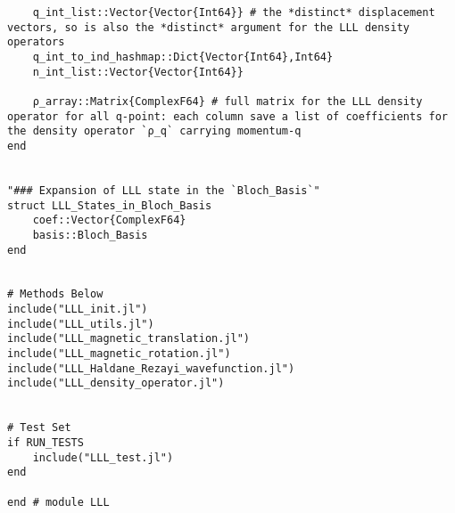 \begin{verbatim}
    q_int_list::Vector{Vector{Int64}} # the *distinct* displacement vectors, so is also the *distinct* argument for the LLL density operators
    q_int_to_ind_hashmap::Dict{Vector{Int64},Int64}
    n_int_list::Vector{Vector{Int64}}

    ρ_array::Matrix{ComplexF64} # full matrix for the LLL density operator for all q-point: each column save a list of coefficients for the density operator `ρ_q` carrying momentum-q
end


"### Expansion of LLL state in the `Bloch_Basis`"
struct LLL_States_in_Bloch_Basis
    coef::Vector{ComplexF64}
    basis::Bloch_Basis
end


# Methods Below
include("LLL_init.jl")
include("LLL_utils.jl")
include("LLL_magnetic_translation.jl")
include("LLL_magnetic_rotation.jl")
include("LLL_Haldane_Rezayi_wavefunction.jl")
include("LLL_density_operator.jl")


# Test Set 
if RUN_TESTS
    include("LLL_test.jl")
end

end # module LLL
\end{verbatim}